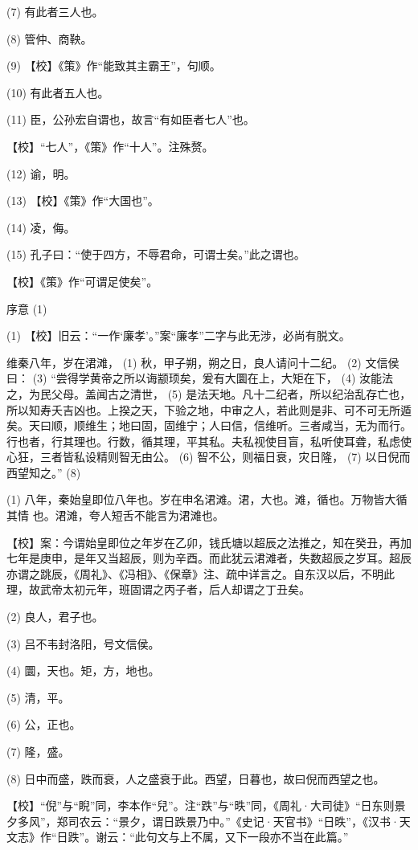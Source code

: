 \documentclass[12pt,UTF8]{ctexbook}
\begin{document}
(7) 有此者三人也。

(8) 管仲、商鞅。

(9) 【校】《策》作“能致其主霸王”，句顺。

(10) 有此者五人也。

(11) 臣，公孙宏自谓也，故言“有如臣者七人”也。

【校】“七人”，《策》作“十人”。注殊赘。

(12) 谕，明。

(13) 【校】《策》作“大国也”。

(14) 凌，侮。

(15) 孔子曰：“使于四方，不辱君命，可谓士矣。”此之谓也。

【校】《策》作“可谓足使矣”。





序意 (1)


(1) 【校】旧云：“一作‘廉孝’。”案“廉孝”二字与此无涉，必尚有脱文。

维秦八年，岁在涒滩， (1) 秋，甲子朔，朔之日，良人请问十二纪。 (2) 文信侯曰： (3) “尝得学黄帝之所以诲颛顼矣，爰有大圜在上，大矩在下， (4) 汝能法之，为民父母。盖闻古之清世， (5) 是法天地。凡十二纪者，所以纪治乱存亡也，所以知寿夭吉凶也。上揆之天，下验之地，中审之人，若此则是非、可不可无所遁矣。天曰顺，顺维生；地曰固，固维宁；人曰信，信维听。三者咸当，无为而行。行也者，行其理也。行数，循其理，平其私。夫私视使目盲，私听使耳聋，私虑使心狂，三者皆私设精则智无由公。 (6) 智不公，则福日衰，灾日隆， (7) 以日倪而西望知之。” (8)

(1) 八年，秦始皇即位八年也。岁在申名涒滩。涒，大也。滩，循也。万物皆大循其情 也。涒滩，夸人短舌不能言为涒滩也。

【校】案：今谓始皇即位之年岁在乙卯，钱氏塘以超辰之法推之，知在癸丑，再加七年是庚申，是年又当超辰，则为辛酉。而此犹云涒滩者，失数超辰之岁耳。超辰亦谓之跳辰，《周礼》、《冯相》、《保章》注、疏中详言之。自东汉以后，不明此理，故武帝太初元年，班固谓之丙子者，后人却谓之丁丑矣。

(2) 良人，君子也。

(3) 吕不韦封洛阳，号文信侯。

(4) 圜，天也。矩，方，地也。

(5) 清，平。

(6) 公，正也。

(7) 隆，盛。

(8) 日中而盛，跌而衰，人之盛衰于此。西望，日暮也，故曰倪而西望之也。

【校】“倪”与“睨”同，李本作“兒”。注“跌”与“昳”同，《周礼·大司徒》“日东则景夕多风”，郑司农云：“景夕，谓日跌景乃中。”《史记·天官书》“日昳”，《汉书·天文志》作“日跌”。谢云：“此句文与上不属，又下一段亦不当在此篇。”
\end{document}
